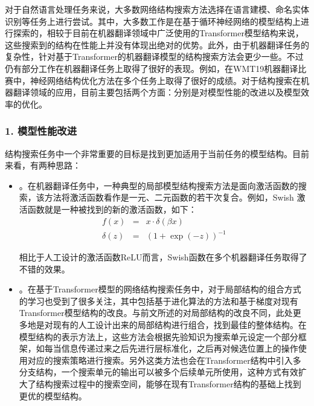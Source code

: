 \parinterval 对于自然语言处理任务来说，大多数网络结构搜索方法选择在语言建模、命名实体识别等任务上进行尝试。其中，大多数工作是在基于循环神经网络的模型结构上进行探索的，相较于目前在机器翻译领域中广泛使用的Transformer模型结构来说，这些搜索到的结构在性能上并没有体现出绝对的优势。此外，由于机器翻译任务的复杂性，针对基于Transformer的机器翻译模型的结构搜索方法会更少一些。不过仍有部分工作在机器翻译任务上取得了很好的表现。例如，在WMT19机器翻译比赛中，神经网络结构优化方法在多个任务上取得了很好的成绩。对于结构搜索在机器翻译领域的应用，目前主要包括两个方面：分别是对模型性能的改进以及模型效率的优化。


\subsubsection{1. 模型性能改进}

\parinterval 结构搜索任务中一个非常重要的目标是找到更加适用于当前任务的模型结构。目前来看，有两种思路：

\begin{itemize}
\vspace{0.5em}
\item {\small{}}。在机器翻译任务中，一种典型的局部模型结构搜索方法是面向激活函数的搜索，该方法将激活函数看作是一元、二元函数的若干次复合。例如，Swish 激活函数就是一种被找到的新的激活函数，如下：
\begin{eqnarray}
f(x) &=& x \cdot \delta(\beta x) \\
\delta(z) &=& {(1 + \exp{(-z)})}^{-1}
\label{eq:15-60}
\end{eqnarray}

\noindent 相比于人工设计的激活函数ReLU而言，Swish函数在多个机器翻译任务取得了不错的效果。
\vspace{0.5em}
\item {\small{}}。在基于Transformer模型的网络结构搜索任务中，对于局部结构的组合方式的学习也受到了很多关注，其中包括基于进化算法的方法和基于梯度对现有Transformer模型结构的改良。与前文所述的对局部结构的改良不同，此处更多地是对现有的人工设计出来的局部结构进行组合，找到最佳的整体结构。在模型结构的表示方法上，这些方法会根据先验知识为搜索单元设定一个部分框架，如每当信息传递过来之后先进行层标准化，之后再对候选位置上的操作使用对应的搜索策略进行搜索。另外这类方法也会在Transformer结构中引入多分支结构，一个搜索单元的输出可以被多个后续单元所使用，这种方式有效扩大了结构搜索过程中的搜索空间，能够在现有Transformer结构的基础上找到更优的模型结构。
\vspace{0.5em}
\end{itemize}

